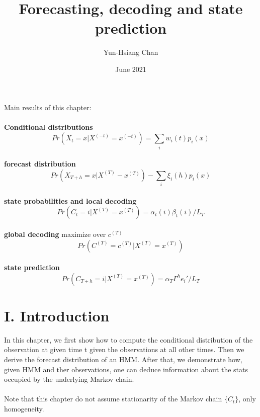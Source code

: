 \documentclass{article}
\title{Forecasting, decoding and state prediction}
\author{Yun-Hsiang Chan}
\date{June 2021}
\begin{document}
\maketitle
Main results of this chapter: \\
\\
\textbf{Conditional distributions}
$$Pr(X_t = x | X^{(-t)} = x^{(-t)}) = \sum_{i} w_i(t) p_i(x)$$
\\
\textbf{forecast distribution}
$$Pr(X_{T+h} = x | X^{(T)} - x^{(T)}) - \sum_{i} \xi_i(h) p_i(x)$$
\\
\textbf{state probabilities and local decoding}
$$Pr(C_t = i | X^{(T)} = x^{(T)}) = \alpha_t(i) \beta_t(i) / L_T$$
\\
\textbf{global decoding} maximize over $c^{(T)}$ 
$$Pr(C^{(T)} = c^{(T)} | X^{(T)} = x^{(T)})$$
\\
\textbf{state prediction}
$$Pr(C_{T+h} = i | X^{(T)} = x^{(T)}) = \alpha_T \Gamma^h e_i' / L_T$$

\section*{I. Introduction}

In this chapter, we first show how to compute the conditional distribution of the observation at given time t given the observations at all other times. Then we derive the forecast distribution of an HMM. After that, we demonstrate how, given HMM and ther observations, one can deduce information about the stats occupied by the underlying Markov chain. \\
\\
Note that this chapter do not assume stationarity of the Markov chain $\{C_t\}$, only homogeneity. 
\end{document}
